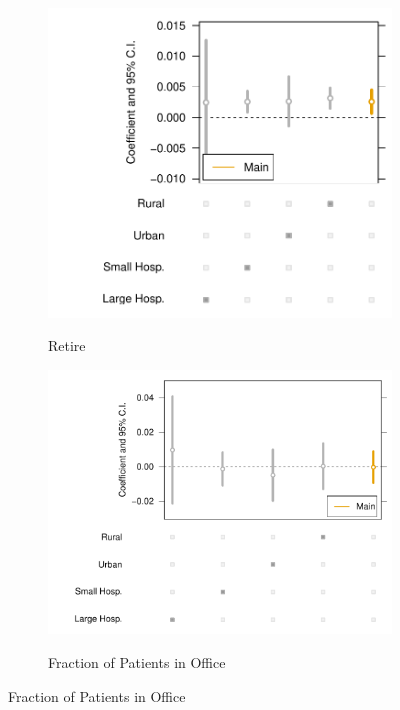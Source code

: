 \documentclass[12pt]{article}
\begin{document}
\begin{figure}[t!]
\begin{subfigure}{0.48\textwidth}
\caption{Retire}
\includegraphics[width=\linewidth]{Objects/retire_heterog.pdf}
\label{fig:a}
\end{subfigure}\hspace*{\fill}
\begin{subfigure}{0.48\textwidth}
\caption{Fraction of Patients in Office}
\includegraphics[width=\linewidth]{Objects/frac_office_heterog.pdf}
\label{fig:b}
\end{subfigure}


\end{figure}
\end{document}
